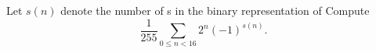 Let $s(n)$ denote the number of s in the binary representation of  Compute
\[
\frac{1}{255}\sum_{0\leq n<16}2^n(-1)^{s(n)}.
\]